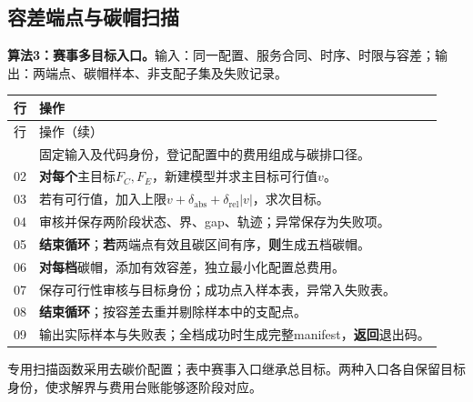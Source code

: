 \subsection{容差端点与碳帽扫描}
\noindent\textbf{算法3：赛事多目标入口。}输入：同一配置、服务合同、时序、时限与容差；输出：两端点、碳帽样本、非支配子集及失败记录。
\begin{longtable}{@{}p{}p{}@{}}
\toprule 行 & 操作\\\midrule
\endfirsthead
\toprule 行 & 操作（续）\\\midrule
\endhead
\bottomrule\endfoot
01 & 固定输入及代码身份，登记配置中的费用组成与碳排口径。\\
02 & \textbf{对每个}主目标$F_C,F_E$，新建模型并求主目标可行值$v$。\\
03 & \quad{}若有可行值，加入上限$v+\delta_{\mathrm{abs}}+\delta_{\mathrm{rel}}|v|$，求次目标。\\
04 & \quad{}审核并保存两阶段状态、界、gap、轨迹；异常保存为失败项。\\
05 & \textbf{结束循环}；\textbf{若}两端点有效且碳区间有序，\textbf{则}生成五档碳帽。\\
06 & \quad\textbf{对每档}碳帽，添加有效容差，独立最小化配置总费用。\\
07 & \quad\quad{}保存可行性审核与目标身份；成功点入样本表，异常入失败表。\\
08 & \quad\textbf{结束循环}；按容差去重并剔除样本中的支配点。\\
09 & 输出实际样本与失败表；全档成功时生成完整manifest，\textbf{返回}退出码。\\
\end{longtable}
专用扫描函数采用去碳价配置；表中赛事入口继承总目标。两种入口各自保留目标身份，使求解界与费用台账能够逐阶段对应。

